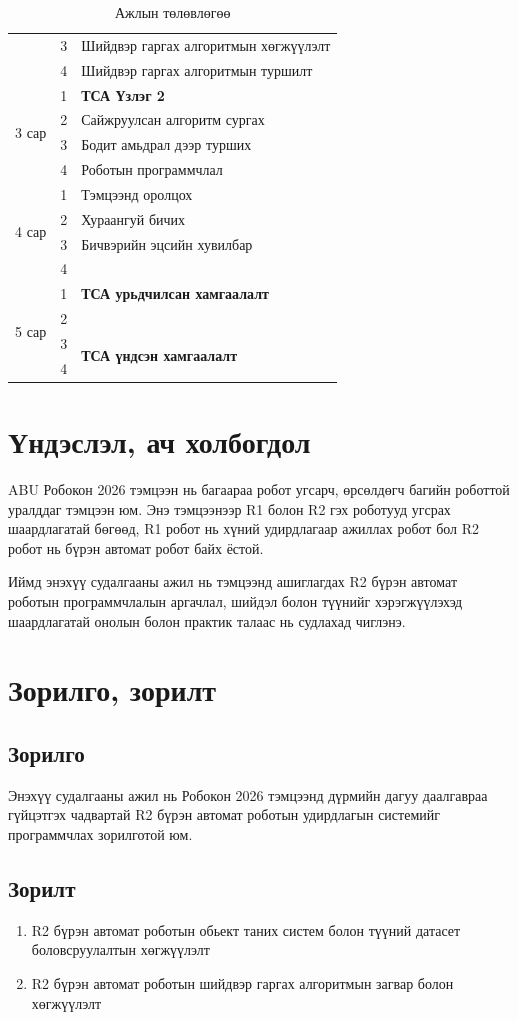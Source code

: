 \begin{table}[h]
\begin{tabular}{|c|c|l|}
        & 3 & Шийдвэр гаргах алгоритмын хөгжүүлэлт \\ \cline{2-3}
        & 4 & Шийдвэр гаргах алгоритмын туршилт \\ \hline
        \multirow{4}{*}{3 сар} & 1 & \textbf{ТСА Үзлэг 2} \\ \cline{2-3}
        & 2 & Сайжруулсан алгоритм сургах \\ \cline{2-3}
        & 3 & Бодит амьдрал дээр турших \\ \cline{2-3}
        & 4 & Роботын программчлал \\ \hline
        \multirow{4}{*}{4 сар} & 1 & Тэмцээнд оролцох \\ \cline{2-3}
        & 2 & Хураангуй бичих \\ \cline{2-3}
        & 3 & Бичвэрийн эцсийн хувилбар \\ \cline{2-3}
        & 4 & \multirow{3}{*}{\textbf{ТСА урьдчилсан хамгаалалт}} \\ \cline{1-2}
        \multirow{4}{*}{5 сар} & 1 & \\ \cline{2-2}
        & 2 & \\ \cline{2-3}
        & 3 & \multirow{2}{*}{\textbf{ТСА үндсэн хамгаалалт}} \\ \cline{2-2}
        & 4 & \\ \hline
    \end{tabular}
    \caption{Ажлын төлөвлөгөө}
    \label{table:plan}
\end{table}

\newpage

\section{Үндэслэл, ач холбогдол}
ABU Робокон 2026 тэмцээн нь багаараа робот угсарч, өрсөлдөгч багийн роботтой уралддаг тэмцээн юм. Энэ тэмцээнээр R1 болон R2 гэх роботууд угсрах шаардлагатай бөгөөд, R1 робот нь хүний удирдлагаар ажиллах робот бол R2 робот нь бүрэн автомат робот байх ёстой.

Иймд энэхүү судалгааны ажил нь тэмцээнд ашиглагдах R2 бүрэн автомат роботын программчлалын аргачлал, шийдэл болон түүнийг хэрэгжүүлэхэд шаардлагатай онолын болон практик талаас нь судлахад чиглэнэ.

\section{Зорилго, зорилт}

\subsection{Зорилго}
Энэхүү судалгааны ажил нь Робокон 2026 тэмцээнд дүрмийн дагуу даалгавраа гүйцэтгэх чадвартай R2 бүрэн автомат роботын удирдлагын системийг программчлах зорилготой юм.

\subsection{Зорилт}
\begin{enumerate}
	\item R2 бүрэн автомат роботын обьект таних систем болон түүний датасет боловсруулалтын хөгжүүлэлт
	\item R2 бүрэн автомат роботын шийдвэр гаргах алгоритмын загвар болон хөгжүүлэлт
\end{enumerate}
